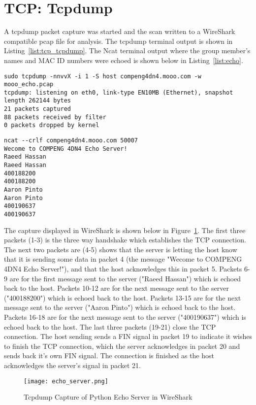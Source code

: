 \section*{TCP: Tcpdump}
A tcpdump packet capture was started and the scan written to a WireShark compatible pcap file for analysis. The tcpdump terminal output is shown in Listing~\ref{list:tcp_tcpdump}. The Ncat terminal output where the group member's names and MAC ID numbers were echoed is shown below in Listing~\ref{list:echo}.

\begin{lstlisting}[caption=Tcpdump Packet Capture of Python Echo Server Connection,label=list:tcp_tcpdump]
sudo tcpdump -nnvvX -i 1 -S host compeng4dn4.mooo.com -w mooo_echo.pcap
tcpdump: listening on eth0, link-type EN10MB (Ethernet), snapshot length 262144 bytes
21 packets captured
88 packets received by filter
0 packets dropped by kernel
\end{lstlisting}

\begin{lstlisting}[caption=Ncat Connection to Python Echo Server,label=list:echo]
ncat --crlf compeng4dn4.mooo.com 50007
Wecome to COMPENG 4DN4 Echo Server!
Raeed Hassan
Raeed Hassan
400188200
400188200
Aaron Pinto
Aaron Pinto
400190637
400190637
\end{lstlisting}

The capture displayed in WireShark is shown below in Figure~\ref{fig:echo_wireshark}. The first three packets (1-3) is the three way handshake which establishes the TCP connection. The next two packets are (4-5) shows that the server is letting the host know that it is sending some data in packet 4 (the message "Wecome to COMPENG 4DN4 Echo Server!"), and that the host acknowledges this in packet 5.
Packets 6-9 are for the first message sent to the server ("Raeed Hassan") which is echoed back to the host.
Packets 10-12 are for the next message sent to the server ("400188200") which is echoed back to the host. 
Packets 13-15 are for the next message sent to the server ("Aaron Pinto") which is echoed back to the host. 
Packets 16-18 are for the next message sent to the server ("400190637") which is echoed back to the host. 
The last three packets (19-21) close the TCP connection. The host sending sends a FIN signal in packet 19 to indicate it wishes to finish the TCP connection, which the server acknowledges in packet 20 and sends back it's own FIN signal. The connection is finished as the host acknowledges the server's signal in packet 21.

\begin{figure}[htp]
\centering
\caption[echo_wireshark]{Tcpdump Capture of Python Echo Server in WireShark}\label{fig:echo_wireshark}
\texttt{[image: echo\_server.png]}
\end{figure}